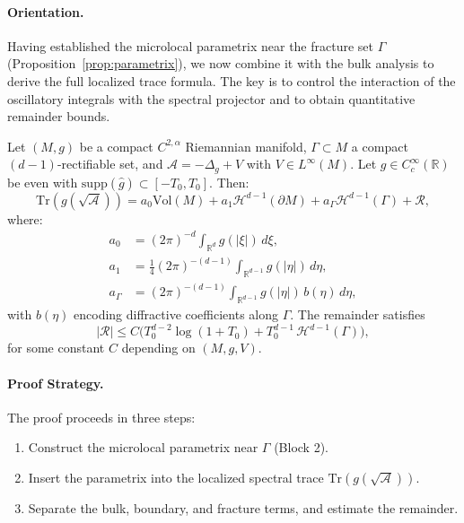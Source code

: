\paragraph{Orientation.}
Having established the microlocal parametrix near the fracture set $\Gamma$
(Proposition~\ref{prop:parametrix}), we now combine it with the bulk analysis
to derive the full localized trace formula. The key is to control the
interaction of the oscillatory integrals with the spectral projector and to
obtain quantitative remainder bounds.


\begin{theorem}
\label{thm:localized-trace}
Let $(M,g)$ be a compact $C^{2,\alpha}$ Riemannian manifold, $\Gamma \subset M$
a compact $(d-1)$-rectifiable set, and $\mathcal{A} = -\Delta_g + V$
with $V \in L^\infty(M)$. Let $g \in C^\infty_c(\mathbb{R})$ be even with
$\mathrm{supp}(\widehat{g}) \subset [-T_0,T_0]$. Then:
\[
\mathrm{Tr}(g(\sqrt{\mathcal{A}}))
= a_0 \mathrm{Vol}(M) + a_1 \mathcal{H}^{d-1}(\partial M) + a_\Gamma \mathcal{H}^{d-1}(\Gamma) + \mathcal{R},
\]
where:
\begin{align*}
a_0 &= (2\pi)^{-d} \int_{\mathbb{R}^d} g(|\xi|)\,d\xi, \\
a_1 &= \tfrac{1}{4}(2\pi)^{-(d-1)} \int_{\mathbb{R}^{d-1}} g(|\eta|)\,d\eta, \\
a_\Gamma &= (2\pi)^{-(d-1)} \int_{\mathbb{R}^{d-1}} g(|\eta|)\,b(\eta)\,d\eta,
\end{align*}
with $b(\eta)$ encoding diffractive coefficients along $\Gamma$.
The remainder satisfies
\[
|\mathcal{R}| \leq C \Big( T_0^{d-2} \log(1+T_0) + T_0^{d-1}\,\mathcal{H}^{d-1}(\Gamma) \Big),
\]
for some constant $C$ depending on $(M,g,V)$.
\end{theorem}


\paragraph{Proof Strategy.}
The proof proceeds in three steps:

\begin{enumerate}[label=(\roman*)]
\item Construct the microlocal parametrix near $\Gamma$ (Block 2).
\item Insert the parametrix into the localized spectral trace
      $\mathrm{Tr}(g(\sqrt{\mathcal{A}}))$.
\item Separate the bulk, boundary, and fracture terms, and estimate the remainder.
\end{enumerate}

